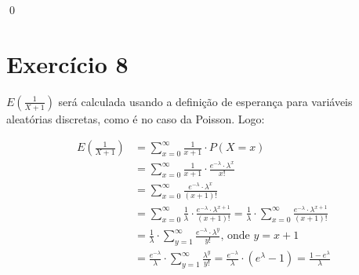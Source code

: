 \documentclass[12pt,letterpaper]{article}
\begin{document}
	\qed
	
	\section*{Exercício 8}
	
	$E(\frac{1}{X+1})$ será calculada usando a definição de esperança para variáveis aleatórias discretas, como é no caso da Poisson. Logo:
	
	\begin{equation*}
		\begin{split}
			E(\frac{1}{X+1}) & = \sum_{x=0}^{\infty} \frac{1}{x+1} \cdot P(X=x)\\
			& = \sum_{x=0}^{\infty} \frac{1}{x+1} \cdot \frac{e^{-\lambda}\cdot \lambda^x}{x!} \\
			& = \sum_{x=0}^{\infty} \frac{e^{-\lambda}\cdot \lambda^x}{(x+1)!} \\
			& = \sum_{x=0}^{\infty}\frac{1}{\lambda} \cdot \frac{e^{-\lambda}\cdot \lambda^{x+1}}{(x+1)!} = \frac{1}{\lambda} \cdot \sum_{x=0}^{\infty} \frac{e^{-\lambda}\cdot \lambda^{x+1}}{(x+1)!} \\
			& = \frac{1}{\lambda} \cdot \sum_{y=1}^{\infty} \frac{e^{-\lambda}\cdot \lambda^y}{y!} \text{, onde } y = x+1 \\
			& = \frac{e^{-\lambda}}{\lambda} \cdot \sum_{y=1}^{\infty} \frac{\lambda^y}{y!} = \frac{e^{-\lambda}}{\lambda} \cdot (e^\lambda - 1) = \frac{1 - e^\lambda}{\lambda}
	\end{split}
	\end{equation*}
	
	
\end{document}
